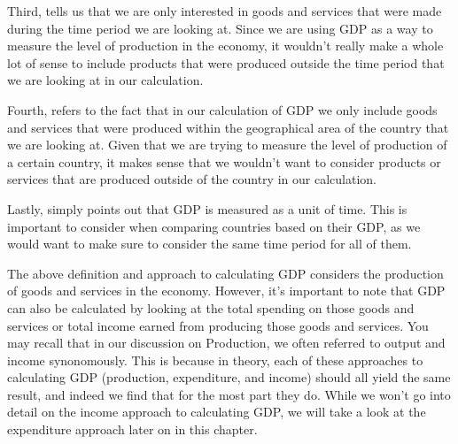 \documentclass[letterpaper,10pt,english]{jupyterBook}
\begin{document}
\sphinxAtStartPar
Third,  tells us that we are only interested in goods and services that were made during the time period we are looking at. Since we are using GDP as a way to measure the level of production in the economy, it wouldn’t really make a whole lot of sense to include products that were produced outside the time period that we are looking at in our calculation.

\sphinxAtStartPar
Fourth,  refers to the fact that in our calculation of GDP we only include goods and services that were produced within the geographical area of the country that we are looking at. Given that we are trying to measure the  level of production of a certain country, it makes sense that we wouldn’t want to consider products or services that are produced outside of the country in our calculation.

\sphinxAtStartPar
Lastly,  simply points out that GDP is measured as a unit of time. This is important to consider when comparing countries based on their GDP, as we would want to make sure to consider the same time period for all of them.

\sphinxAtStartPar
The above definition and approach to calculating GDP considers the production of goods and services in the economy. However, it’s important to note that GDP can also be calculated by looking at the total spending on those goods and services or total income earned from producing those goods and services. You may recall that in our discussion on Production, we often referred to output and income synonomously. This is because in theory, each of these approaches to calculating GDP (production, expenditure, and income) should all yield the same result, and indeed we find that for the most part they do. While we won’t go into detail on the income approach to calculating GDP, we will take a look at the expenditure approach later on in this chapter.
\end{document}
